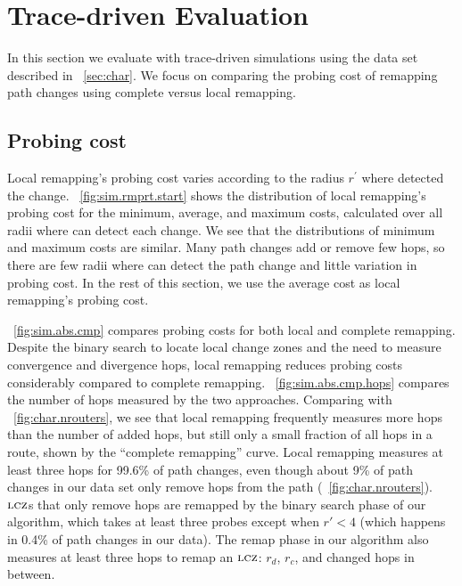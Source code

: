 \section{Trace-driven Evaluation}
\label{sec:sim}

In this section we evaluate \dtrack{} with trace-driven simulations
using the data set described in \secstr~\ref{sec:char}.  We focus
on comparing the probing cost of remapping path changes using complete
versus local remapping.

\subsection{Probing cost}

Local remapping's probing cost varies according to the radius $r^\prime$
where \dtrack{} detected the change.  \figstr~\ref{fig:sim.rmprt.start}
shows the distribution of local remapping's probing cost for the
minimum, average, and maximum costs, calculated over all radii where
\dtrack{} can detect each change.  We see that the distributions of
minimum and maximum costs are similar.  Many path changes add or remove
few hops, so there are few radii where \dtrack{} can detect the path
change and little variation in probing cost.  In the rest of this
section, we use the average cost as local remapping's probing cost.


\figstr~\ref{fig:sim.abs.cmp} compares probing costs for both local and
complete remapping.  Despite the binary search to locate local change
zones and the need to measure convergence and divergence hops, local
remapping reduces probing costs considerably compared to complete
remapping.  \figstr~\ref{fig:sim.abs.cmp.hops} compares the number of
hops measured by the two approaches.  Comparing with
\figstr~\ref{fig:char.nrouters}, we see that local remapping frequently
measures more hops than the number of added hops, but still only a small
fraction of all hops in a route, shown by the ``complete remapping''
curve.  Local remapping measures at least three hops for 99.6\% of path
changes, even though about 9\% of path changes in our data set only
remove hops from the path (\figstr~\ref{fig:char.nrouters}).  $\mathrm{\textsc{lcz}}$s
that only remove hops are remapped by the binary search phase of our
algorithm, which takes at least three probes except when $r' < 4$ (which
happens in 0.4\% of path changes in our data).  The remap phase in our
algorithm also measures at least three hops to remap an $\mathrm{\textsc{lcz}}$: $r_d$,
$r_c$, and changed hops in between.

